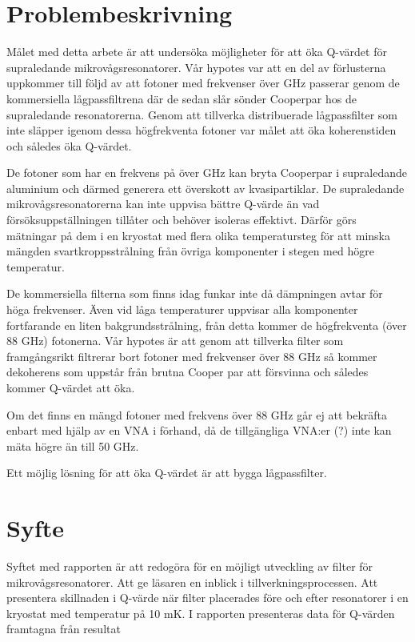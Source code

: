 \documentclass[main.tex]{subfiles}
\begin{document}




\section{Problembeskrivning}

Målet med detta arbete är att undersöka möjligheter för att öka Q-värdet för supraledande mikrovågsresonatorer. Vår hypotes var att en del av förlusterna uppkommer till följd av att fotoner med frekvenser över \unit[88]{GHz} passerar genom de kommersiella lågpassfiltrena där de sedan slår sönder Cooperpar hos de supraledande resonatorerna. Genom att tillverka distribuerade lågpassfilter som inte släpper igenom dessa högfrekventa fotoner var målet att öka koherenstiden och således öka Q-värdet.


De fotoner som har en frekvens på över \unit[88]{GHz} kan bryta Cooperpar i supraledande aluminium och därmed generera ett överskott av kvasipartiklar. De supraledande mikrovågsresonatorerna kan inte uppvisa bättre Q-värde än vad försöksuppställningen tillåter och behöver isoleras effektivt. Därför görs mätningar på dem i en kryostat med flera olika temperatursteg för att minska mängden svartkroppsstrålning från övriga komponenter i stegen med högre temperatur. 


De kommersiella filterna som finns idag funkar inte då dämpningen avtar för höga frekvenser. Även vid låga temperaturer uppvisar alla komponenter fortfarande en liten bakgrundsstrålning, från detta kommer de högfrekventa (över 88 GHz) fotonerna. Vår hypotes är att genom att tillverka filter som framgångsrikt filtrerar bort fotoner med frekvenser över 88 GHz så kommer dekoherens som uppstår från brutna Cooper par att försvinna och således kommer Q-värdet att öka.


Om det finns en mängd fotoner med frekvens över 88 GHz går ej att bekräfta enbart med hjälp av en VNA i förhand, då de tillgängliga VNA:er (?) inte kan mäta högre än till 50 GHz.



Ett möjlig lösning för att öka Q-värdet är att bygga lågpassfilter. 

\section{Syfte}
Syftet med rapporten är att redogöra för en möjligt utveckling av filter för mikrovågsresonatorer. Att ge läsaren en inblick i tillverkningsprocessen. Att presentera skillnaden i Q-värde när filter placerades före och efter resonatorer i en kryostat med temperatur på 10 mK. I rapporten presenteras data för Q-värden framtagna från resultat
\end{document}
